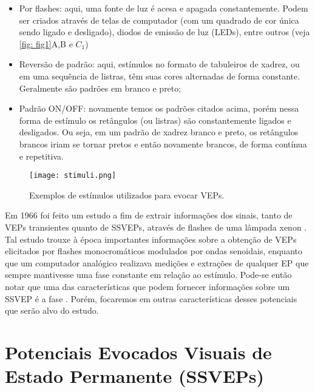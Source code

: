 \begin{itemize}
    \item Por flashes: aqui, uma fonte de luz é acesa e apagada constantemente. Podem ser criados através de telas de computador (com um quadrado de cor única sendo ligado e desligado), diodos de emissão de luz (LEDs), entre outros (veja \autoref{fig: fig1}A,B e $C_1$)

    \item Reversão de padrão: aqui, estímulos no formato de tabuleiros de xadrez, ou em uma sequência de listras, têm suas cores alternadas de forma constante. Geralmente são padrões em branco e preto;
    
    \item Padrão ON/OFF: novamente temos os padrões citados acima, porém nessa forma de estímulo os retângulos (ou listras) são constantemente ligados e desligados. Ou seja, em um padrão de xadrez branco e preto, os retângulos brancos iriam se tornar pretos e então novamente brancos, de forma contínua e repetitiva.
\end{itemize}

\begin{figure}[ht]
    \caption{Exemplos de estímulos utilizados para evocar VEPs.}
    \label{fig: fig1}
    \centering
    \texttt{[image: stimuli.png]}
\end{figure}

Em 1966 foi feito um estudo a fim de extrair informações dos sinais, tanto de VEPs transientes quanto de SSVEPs, através de flashes de uma lâmpada xenon \cite{Regan1966}. Tal estudo trouxe à época importantes informações sobre a obtenção de VEPs elicitados por flashes monocromáticos modulados por ondas senoidais, enquanto que um computador analógico realizava medições e extrações de qualquer EP que sempre mantivesse uma fase constante em relação ao estímulo. Pode-se então notar que uma das características que podem fornecer informações sobre um SSVEP é a fase \cite{Kluge2007,Liang2020}. Porém, focaremos em outras características desses potenciais que serão alvo do estudo.

\section{Potenciais Evocados Visuais de Estado Permanente (SSVEPs)}\label{ssvep}

